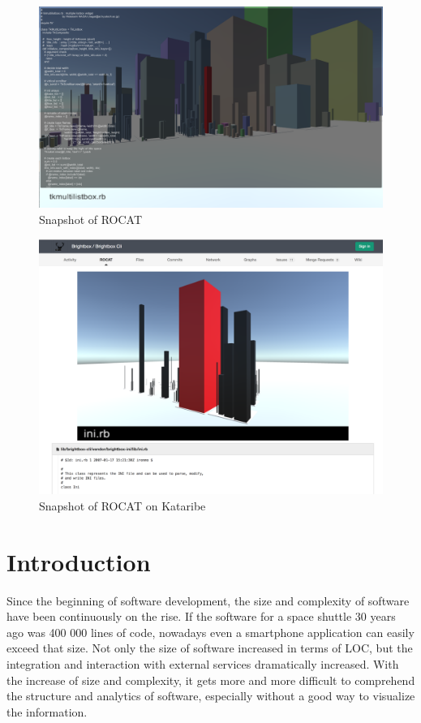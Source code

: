 \documentclass[conference]{IEEEtran}
\begin{document}
\begin{figure}[t!]
\centering
\includegraphics[bb=0 0 1598 937, width=18cm]{rocat.png}
\caption{Snapshot of ROCAT}
\label{figure:rocat}
\end{figure}

\begin{figure}[t!]
\centering
\includegraphics[bb=0 0 1218 905, width=18cm]{rocat-on-kataribe.png}
\caption{Snapshot of ROCAT on Kataribe}
\label{figure:rocat-on-kataribe}
\end{figure}

\section{Introduction}
Since the beginning of software development, the size and complexity of software have been continuously on the rise.
If the software for a space shuttle 30 years ago was 400 000 lines of code, nowadays even a smartphone application can easily exceed that size.
Not only the size of software increased in terms of LOC, but the integration and interaction with external services dramatically increased.
With the increase of size and complexity, it gets more and more difficult to comprehend the structure and analytics of software, especially without a good way to visualize the information.
\end{document}
